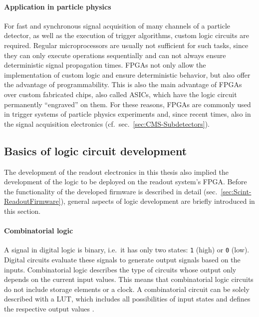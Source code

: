 \paragraph{Application in particle physics}
For fast and synchronous signal acquisition of many channels of a particle detector, as well as the execution of trigger algorithms, custom logic circuits are required. Regular microprocessors are usually not sufficient for such tasks, since they can only execute operations sequentially and can not always ensure deterministic signal propagation times. \acp{FPGA} not only allow the implementation of custom logic and ensure deterministic behavior, but also offer the advantage of programmability. This is also the main advantage of \acp{FPGA} over custom fabricated chips, also called \acp{ASIC}, which have the logic circuit permanently \enquote{engraved} on them. For these reasons, \acp{FPGA} are commonly used in trigger systems of particle physics experiments and, since recent times, also in the signal acquisition electronics (cf.\ sec.\ \ref{sec:CMS-Subdetectors}).

\subsection{Basics of logic circuit development}
\label{sec:ReadoutElectronics-LogicCircuits}
The development of the readout electronics in this thesis also implied the development of the logic to be deployed on the readout system's \ac{FPGA}. Before the functionality of the developed firmware is described in detail (sec.\ \ref{sec:Scint-ReadoutFirmware}), general aspects of logic development are briefly introduced in this section.
\paragraph{Combinatorial logic} A signal in digital logic is binary, i.e.\ it has only two states: \texttt{1} (high) or \texttt{0} (low). Digital circuits evaluate these signals to generate output signals based on the inputs. Combinatorial logic describes the type of circuits whose output only depends on the current input values. This means that combinatorial logic circuits do not include storage elements or a clock. A combinatorial circuit can be solely described with a \ac{LUT}, which includes all possibilities of input states and defines the respective output values \cite{FPGA-LogicCircuitsVHDL}.
